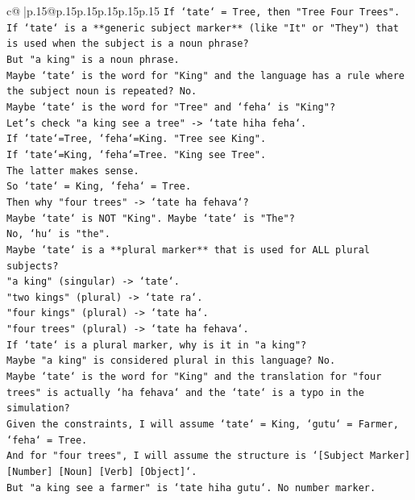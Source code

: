 \documentclass{article}
\begin{document}
{\begin{supertabular}{c@{$\;$}|p{.15\linewidth}@{}p{.15\linewidth}p{.15\linewidth}p{.15\linewidth}p{.15\linewidth}p{.15\linewidth}}
{{{\texttt{If `tate` = Tree, then "Tree Four Trees".} \\
\texttt{If `tate` is a **generic subject marker** (like "It" or "They") that is used when the subject is a noun phrase?} \\
\texttt{But "a king" is a noun phrase.} \\
\texttt{Maybe `tate` is the word for "King" and the language has a rule where the subject noun is repeated? No.} \\
\texttt{Maybe `tate` is the word for "Tree" and `feha` is "King"?} \\
\texttt{Let's check "a king see a tree" {-}> `tate hiha feha`.} \\
\texttt{If `tate`=Tree, `feha`=King. "Tree see King".} \\
\texttt{If `tate`=King, `feha`=Tree. "King see Tree".} \\
\texttt{The latter makes sense.} \\
\texttt{So `tate` = King, `feha` = Tree.} \\
\texttt{Then why "four trees" {-}> `tate ha fehava`?} \\
\texttt{Maybe `tate` is NOT "King". Maybe `tate` is "The"?} \\
\texttt{No, `hu` is "the".} \\
\texttt{Maybe `tate` is a **plural marker** that is used for ALL plural subjects?} \\
\texttt{"a king" (singular) {-}> `tate`.} \\
\texttt{"two kings" (plural) {-}> `tate ra`.} \\
\texttt{"four kings" (plural) {-}> `tate ha`.} \\
\texttt{"four trees" (plural) {-}> `tate ha fehava`.} \\
\texttt{If `tate` is a plural marker, why is it in "a king"?} \\
\texttt{Maybe "a king" is considered plural in this language? No.} \\
\texttt{Maybe `tate` is the word for "King" and the translation for "four trees" is actually `ha fehava` and the `tate` is a typo in the simulation?} \\
\texttt{Given the constraints, I will assume `tate` = King, `gutu` = Farmer, `feha` = Tree.} \\
\texttt{And for "four trees", I will assume the structure is `{[}Subject Marker{]} {[}Number{]} {[}Noun{]} {[}Verb{]} {[}Object{]}`.} \\
\texttt{But "a king see a farmer" is `tate hiha gutu`. No number marker.} \\
}}}
\end{supertabular}}
\end{document}
